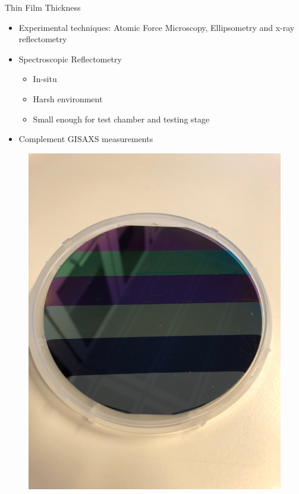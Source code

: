 \documentclass[10pt]{beamer}
\begin{document}
	\begin{frame}{Thin Film Thickness}
	
	\begin{minipage}{0.47\textwidth}
	    \begin{itemize}
	    \item Experimental techniques: Atomic Force Microscopy, Ellipsometry and x-ray reflectometry
	    \item Spectroscopic Reflectometry
	    \begin{itemize}
	    \item In-situ
	    \item Harsh environment
	    \item Small enough for test chamber and testing stage
	    \end{itemize}
	    \item Complement GISAXS measurements 
	    \end{itemize}
	\end{minipage}
	\begin{minipage}{0.5\textwidth}
	    \begin{figure}
	    \includegraphics[scale=0.025,angle=-90]{stepwafer.JPG}
	    \end{figure}
	\end{minipage}
	
 
	\end{frame}
	
\end{document}
